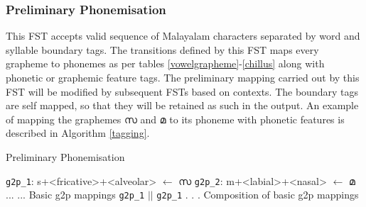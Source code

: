 \documentclass{ieeeaccess}
\begin{document}
\subsubsection{Preliminary Phonemisation}


This FST accepts valid sequence of Malayalam characters separated by word and syllable boundary tags. The transitions defined by this FST maps every grapheme to phonemes as per tables \ref{vowelgrapheme}-\ref{chillus} along with phonetic or graphemic feature tags. 
The preliminary mapping carried out by this FST will be modified by subsequent FSTs based on contexts. The boundary tags are self mapped, so that they will be retained as such in the output. An example of mapping the graphemes {\mal സ} and {\mal മ} to its phoneme with phonetic features is described in Algorithm \ref{tagging}.






\begin{algorithm}
	\caption{Preliminary Phonemisation}\label{tagging}
	\begin{algorithmic}[1]
		\State \texttt{g2p\_1}: {\ipa s+<fricative>+<alveolar>} $\gets$ {\mal സ}
		\State  \texttt{g2p\_2}: {\ipa m+<labial>+<nasal>} $\gets$ {\mal മ} 
		\State ...
		\State ... \Comment Basic g2p mappings
		\State \Return \texttt{g2p\_1} $||$ \texttt{g2p\_1} . . . 
  \State \Comment Composition of basic g2p mappings
	\EndProcedure
	\end{algorithmic}
\end{algorithm}
\end{document}
